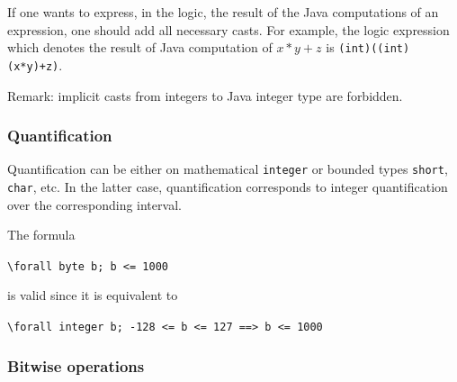 \documentclass[a4paper,11pt,twoside,openright]{report}
\begin{document}
If one wants to express, in the logic, the result of the Java
computations of an expression, one should add all necessary casts. For
example, the logic expression which denotes the result of Java
computation of $x*y+z$ is \texttt{(int)((int)(x*y)+z)}.



Remark: implicit casts from integers to Java integer type are forbidden.



\subsubsection{Quantification}
\label{sec:quantification}

Quantification can be either on mathematical \verb|integer| or bounded
types \verb|short|, \verb|char|, etc. In the latter case,
quantification corresponds to integer quantification over the
corresponding interval.
\begin{example}
The formula
  \begin{center}
    \verb|\forall byte b; b <= 1000|
  \end{center}
is valid since it is equivalent to
\begin{center}
  \verb|\forall integer b; -128 <= b <= 127 ==> b <= 1000|
\end{center}
\end{example}

\subsubsection{Bitwise operations}
\end{document}
